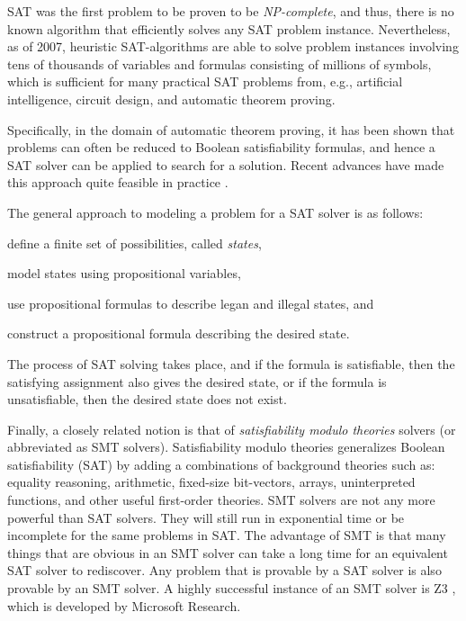 SAT was the first problem to be proven to be \emph{NP-complete}, and thus, there is no known algorithm that efficiently solves any SAT problem instance. Nevertheless, as of 2007, heuristic SAT-algorithms are able to solve problem instances involving tens of thousands of variables and formulas consisting of millions of symbols, which is sufficient for many practical SAT problems from, e.g., artificial intelligence, circuit design, and automatic theorem proving.

Specifically, in the domain of automatic theorem proving, it has been shown that problems can often be reduced to Boolean satisfiability formulas, and hence a SAT solver can be applied to search for a solution. Recent advances have made this approach quite feasible in practice \cite{misc:2007:Gomes,article:2005:Weber,article:2015:Heule}.

The general approach to modeling a problem for a SAT solver is as follows:
\begin{inparaenum}[(1)]
\item define a finite set of possibilities, called \emph{states},
\item model states using propositional variables,
\item use propositional formulas to describe legan and illegal states, and
\item construct a propositional formula describing the desired state.
\end{inparaenum}
The process of SAT solving takes place, and if the formula is satisfiable, then the satisfying assignment also gives the desired state, or if the formula is unsatisfiable, then the desired state does not exist.

Finally, a closely related notion is that of \emph{satisfiability modulo theories} solvers \cite{article:2017:Reynolds,popl:2014:Li} (or abbreviated as SMT solvers). Satisfiability modulo theories generalizes Boolean satisfiability (SAT) by adding a combinations of background theories such as: equality reasoning, arithmetic, fixed-size bit-vectors, arrays, uninterpreted functions, and other useful first-order theories. SMT solvers are not any more powerful than SAT solvers. They will still run in exponential time or be incomplete for the same problems in SAT. The advantage of SMT is that many things that are obvious in an SMT solver can take a long time for an equivalent SAT solver to rediscover. Any problem that is provable by a SAT solver is also provable by an SMT solver. A highly successful instance of an SMT solver is Z3 \cite{tacas:2008:DeMoura}, which is developed by Microsoft Research.


